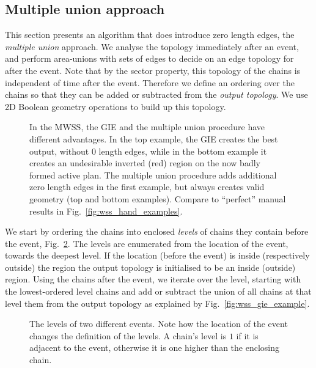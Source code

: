
\subsection{Multiple union approach}

This section presents an algorithm that does introduce zero length edges, the \emph{multiple union} approach. We analyse the topology immediately after an event, and perform area-unions with sets of edges to decide on an edge topology for after the event. Note that by the sector property, this topology of the chains is independent of time after the event. Therefore we define an ordering over the chains so that they can be added or subtracted from the \emph{output topology}. We use 2D Boolean geometry operations to build up this topology.


\begin{figure}
  \centering
  \def\svgwidth{1.0\columnwidth}
  
  \caption[A comparison of the GIE and multiple union procedure]{\label{fig:wss_union_vs_gie} In the MWSS, the GIE and the multiple union procedure  have different advantages. In the top example, the GIE creates the best output, without 0 length edges, while in the bottom example it creates an undesirable inverted (red) region on the now badly formed active plan. The multiple union procedure adds additional zero length edges in the first example, but always creates valid geometry (top and bottom examples). Compare to ``perfect'' manual results in Fig.~\ref{fig:wss_hand_examples}.}
\end{figure}


We start by ordering the chains into enclosed \emph{levels} of chains they contain before the event, Fig.~\ref{fig:wss_numbered_union}. The levels are enumerated from the location of the event, towards the deepest level. If the location (before the event) is inside (respectively outside) the region the output topology is initialised to be an inside (outside) region. Using the chains after the event, we iterate over the level, starting with the lowest-ordered level chains and add or subtract the union of all chains at that level them from the output topology as explained by Fig.~\ref{fig:wss_gie_example}. 

\begin{figure}
  \centering
  \def\svgwidth{1.0\columnwidth}
  
  \caption[Identify the level of chains]{\label{fig:wss_numbered_union} The levels of two different events. Note how the location of the event changes the definition of the levels. A chain's level is $1$ if it is adjacent to the event, otherwise it is one higher than the enclosing chain.}
\end{figure}

